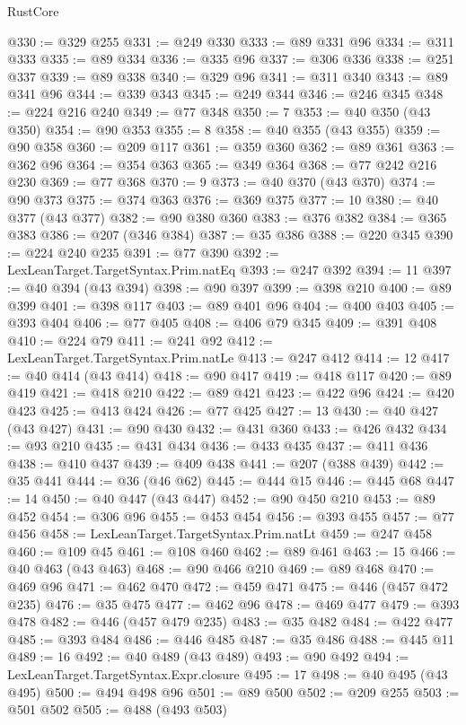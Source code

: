 \begin{lexlean}{RustCore}
\begin{coremodule}
@330 := @329 @255
@331 := @249 @330
@333 := @89 @331 @96
@334 := @311 @333
@335 := @89 @334
@336 := @335 @96
@337 := @306 @336
@338 := @251 @337
@339 := @89 @338
@340 := @329 @96
@341 := @311 @340
@343 := @89 @341 @96
@344 := @339 @343
@345 := @249 @344
@346 := @246 @345
@348 := @224 @216 @240
@349 := @77 @348
@350 := 7
@353 := @40 @350 (@43 @350)
@354 := @90 @353
@355 := 8
@358 := @40 @355 (@43 @355)
@359 := @90 @358
@360 := @209 @117
@361 := @359 @360
@362 := @89 @361
@363 := @362 @96
@364 := @354 @363
@365 := @349 @364
@368 := @77 @242 @216 @230
@369 := @77 @368
@370 := 9
@373 := @40 @370 (@43 @370)
@374 := @90 @373
@375 := @374 @363
@376 := @369 @375
@377 := 10
@380 := @40 @377 (@43 @377)
@382 := @90 @380 @360
@383 := @376 @382
@384 := @365 @383
@386 := @207 (@346 @384)
@387 := @35 @386
@388 := @220 @345
@390 := @224 @240 @235
@391 := @77 @390
@392 := LexLeanTarget.TargetSyntax.Prim.natEq
@393 := @247 @392
@394 := 11
@397 := @40 @394 (@43 @394)
@398 := @90 @397
@399 := @398 @210
@400 := @89 @399
@401 := @398 @117
@403 := @89 @401 @96
@404 := @400 @403
@405 := @393 @404
@406 := @77 @405
@408 := @406 @79 @345
@409 := @391 @408
@410 := @224 @79
@411 := @241 @92
@412 := LexLeanTarget.TargetSyntax.Prim.natLe
@413 := @247 @412
@414 := 12
@417 := @40 @414 (@43 @414)
@418 := @90 @417
@419 := @418 @117
@420 := @89 @419
@421 := @418 @210
@422 := @89 @421
@423 := @422 @96
@424 := @420 @423
@425 := @413 @424
@426 := @77 @425
@427 := 13
@430 := @40 @427 (@43 @427)
@431 := @90 @430
@432 := @431 @360
@433 := @426 @432
@434 := @93 @210
@435 := @431 @434
@436 := @433 @435
@437 := @411 @436
@438 := @410 @437
@439 := @409 @438
@441 := @207 (@388 @439)
@442 := @35 @441
@444 := @36 (@46 @62)
@445 := @444 @15
@446 := @445 @68
@447 := 14
@450 := @40 @447 (@43 @447)
@452 := @90 @450 @210
@453 := @89 @452
@454 := @306 @96
@455 := @453 @454
@456 := @393 @455
@457 := @77 @456
@458 := LexLeanTarget.TargetSyntax.Prim.natLt
@459 := @247 @458
@460 := @109 @45
@461 := @108 @460
@462 := @89 @461
@463 := 15
@466 := @40 @463 (@43 @463)
@468 := @90 @466 @210
@469 := @89 @468
@470 := @469 @96
@471 := @462 @470
@472 := @459 @471
@475 := @446 (@457 @472 @235)
@476 := @35 @475
@477 := @462 @96
@478 := @469 @477
@479 := @393 @478
@482 := @446 (@457 @479 @235)
@483 := @35 @482
@484 := @422 @477
@485 := @393 @484
@486 := @446 @485
@487 := @35 @486
@488 := @445 @11
@489 := 16
@492 := @40 @489 (@43 @489)
@493 := @90 @492
@494 := LexLeanTarget.TargetSyntax.Expr.closure
@495 := 17
@498 := @40 @495 (@43 @495)
@500 := @494 @498 @96
@501 := @89 @500
@502 := @209 @255
@503 := @501 @502
@505 := @488 (@493 @503)

\end{coremodule}
\end{lexlean}
